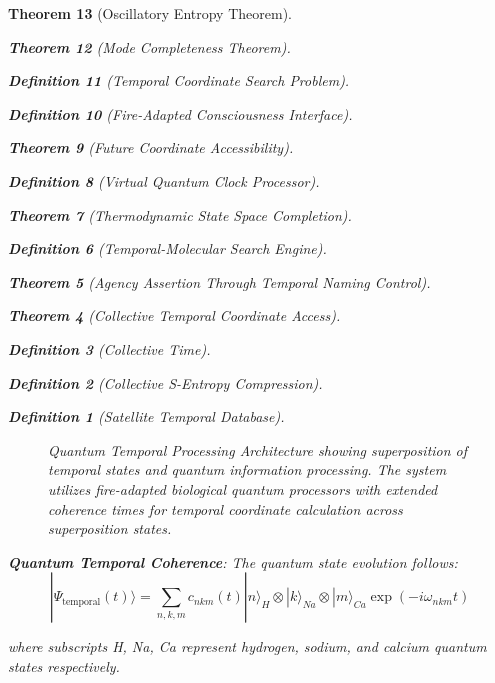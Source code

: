 \documentclass[12pt,a4paper]{article}
\newtheorem{theorem}{Theorem}[section]
\newtheorem{definition}[theorem]{Definition}
\begin{document}
\begin{theorem}[Oscillatory Entropy Theorem]
\begin{theorem}[Mode Completeness Theorem]
\begin{enumerate}
\begin{definition}[Temporal Coordinate Search Problem]
\begin{algorithm}
\begin{definition}[Fire-Adapted Consciousness Interface]
\begin{theorem}[Future Coordinate Accessibility]
\begin{definition}[Virtual Quantum Clock Processor]
\begin{itemize}
\begin{itemize}
\begin{theorem}[Thermodynamic State Space Completion]
\begin{definition}[Temporal-Molecular Search Engine]
\begin{theorem}[Agency Assertion Through Temporal Naming Control]
\begin{remark}
\begin{theorem}[Collective Temporal Coordinate Access]
\begin{definition}[Collective Time]
\begin{definition}[Collective S-Entropy Compression]
\begin{definition}[Satellite Temporal Database]
\begin{algorithm}
\begin{table}[h]
{\begin{figure}[H]
\caption{Quantum Temporal Processing Architecture showing superposition of temporal states and quantum information processing. The system utilizes fire-adapted biological quantum processors with extended coherence times for temporal coordinate calculation across superposition states.}
\label{fig:quantum_temporal_processing}
\end{figure}

\textbf{Quantum Temporal Coherence}: The quantum state evolution follows:
$$|\Psi_{\text{temporal}}(t)\rangle = \sum_{n,k,m} c_{nkm}(t) |n\rangle_H \otimes |k\rangle_{Na} \otimes |m\rangle_{Ca} \exp(-i\omega_{nkm} t)$$

where subscripts H, Na, Ca represent hydrogen, sodium, and calcium quantum states respectively.

}
\end{table}
\end{algorithm}
\end{definition}
\end{definition}
\end{definition}
\end{theorem}
\end{remark}
\end{theorem}
\end{definition}
\end{theorem}
\end{itemize}
\end{itemize}
\end{definition}
\end{theorem}
\end{definition}
\end{algorithm}
\end{definition}
\end{enumerate}
\end{theorem}
\end{theorem}
\end{document}

